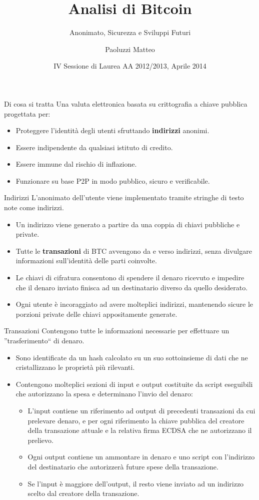 \documentclass[italian]{beamer}
\title[Bitcoin]{Analisi di Bitcoin}
\subtitle{Anonimato, Sicurezza e Sviluppi Futuri}
\author[Paoluzzi Matteo]{Paoluzzi Matteo}
\institute[UniUD]{Università degli Studi di Udine\and{}Relatore:\\{}Dott. Ivan Scagnetto}
\date[2014/04/03]{IV Sessione di Laurea AA 2012/2013, Aprile 2014}
\begin{document}
\frame{\titlepage}

\begin{frame}{Di cosa si tratta} %
Una valuta elettronica basata su crittografia a chiave pubblica progettata per:
\begin{itemize}
 \item Proteggere l'identità degli utenti sfruttando \textbf{indirizzi} anonimi.
 \item Essere indipendente da qualsiasi istituto di credito.
 \item Essere immune dal rischio di inflazione.
 \item Funzionare su base P2P in modo pubblico, sicuro e verificabile.
\end{itemize}
\end{frame}

\begin{frame}{Indirizzi} %
L'anonimato dell'utente viene implementato tramite stringhe di testo note come indirizzi.
\begin{itemize}
 \item Un indirizzo viene generato a partire da una coppia di chiavi pubbliche e private.
 \item Tutte le \textbf{transazioni} di BTC avvengono da e verso indirizzi, senza divulgare informazioni sull'identità delle parti coinvolte.
 \item Le chiavi di cifratura consentono di spendere il denaro ricevuto e impedire che il denaro inviato finisca ad un destinatario diverso da quello desiderato.
 \item Ogni utente è incoraggiato ad avere molteplici indirizzi, mantenendo sicure le porzioni private delle chiavi appositamente generate.
\end{itemize}
\end{frame}

\begin{frame}{Transazioni} %
Contengono tutte le informazioni necessarie per effettuare un ''trasferimento`` di denaro.
\begin{itemize}
 \item Sono identificate da un hash calcolato su un suo sottoinsieme di dati che ne cristallizzano le proprietà più rilevanti.
 \item Contengono molteplici sezioni di input e output costituite da script eseguibili che autorizzano la spesa e determinano l'invio del denaro:
 \begin{itemize}
  \item L'input contiene un riferimento ad output di precedenti transazioni da cui prelevare denaro, e per ogni riferimento la chiave pubblica del creatore della transazione attuale e la relativa firma ECDSA che ne autorizzano il prelievo.
  \item Ogni output contiene un ammontare in denaro e uno script con l'indirizzo del destinatario che autorizzerà future spese della transazione.
  \item Se l'input è maggiore dell'output, il resto viene inviato ad un indirizzo scelto dal creatore della transazione.
 \end{itemize}
\end{itemize}
\end{frame}
\end{document}
